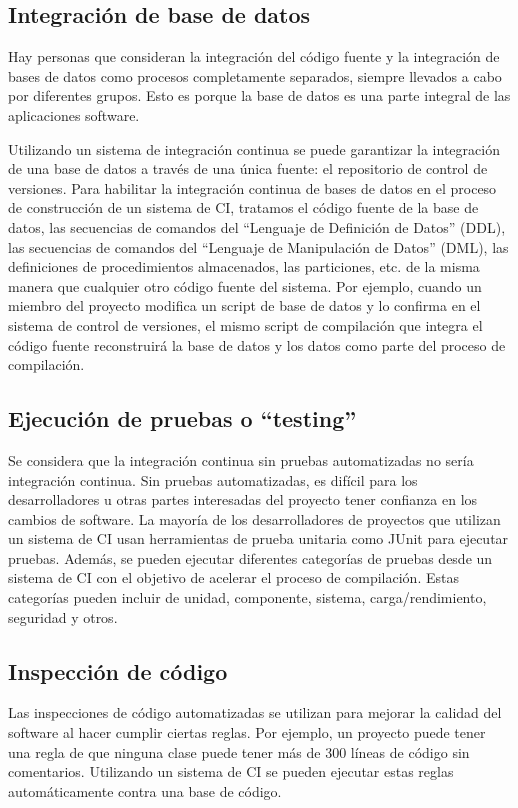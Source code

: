 \subsection{Integración de base de datos}
Hay personas que consideran la integración del código fuente y la integración de bases de datos como procesos completamente separados, siempre llevados a cabo por diferentes grupos. Esto es porque la base de datos es una parte integral de las aplicaciones software. 

Utilizando un sistema de integración continua se puede garantizar la integración de una base de datos a través de una única fuente: el repositorio de control de versiones. Para habilitar la integración continua de bases de datos en el proceso de construcción de un sistema de CI, tratamos el código fuente de la base de datos, las secuencias de comandos del ``Lenguaje de Definición de Datos'' (DDL), las secuencias de comandos del ``Lenguaje de Manipulación de Datos'' (DML), las definiciones de procedimientos almacenados, las particiones, etc. de la misma manera que cualquier otro código fuente del sistema. Por ejemplo, cuando un miembro del proyecto modifica un script de base de datos y lo confirma en el sistema de control de versiones, el mismo script de compilación que integra el código fuente reconstruirá la base de datos y los datos como parte del proceso de compilación.

\subsection{Ejecución de pruebas o “testing”}
Se considera que la integración continua sin pruebas automatizadas no sería integración continua. Sin pruebas automatizadas, es difícil para los desarrolladores u otras partes interesadas del proyecto tener confianza en los cambios de software. La mayoría de los desarrolladores de proyectos que utilizan un sistema de CI usan herramientas de prueba unitaria como JUnit para ejecutar pruebas. Además, se pueden ejecutar diferentes categorías de pruebas desde un sistema de CI con el objetivo de acelerar el proceso de compilación. Estas categorías pueden incluir de unidad, componente, sistema, carga/rendimiento, seguridad y otros.

\subsection{Inspección de código}
Las inspecciones de código automatizadas se utilizan para mejorar la calidad del software al hacer cumplir ciertas reglas. Por ejemplo, un proyecto puede tener una regla de que ninguna clase puede tener más de 300 líneas de código sin comentarios. Utilizando un sistema de CI se pueden ejecutar estas reglas automáticamente contra una base de código.

